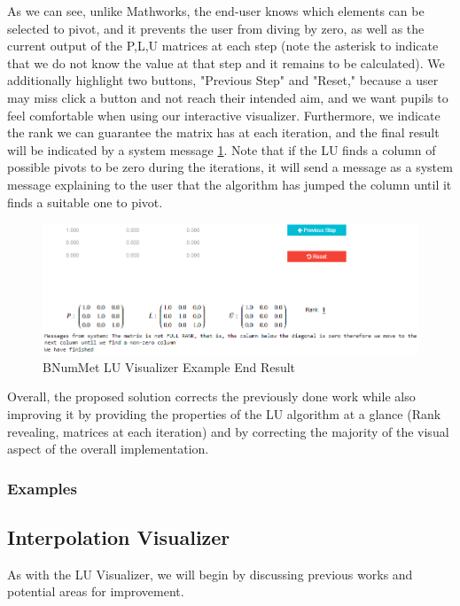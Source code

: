 As we can see, unlike Mathworks, the end-user knows which elements can be selected to pivot, and it prevents the user from diving by zero, as well as the current output of the P,L,U matrices at each step (note the asterisk to indicate that we do not know the value at that step and it remains to be calculated). We additionally highlight two buttons, "Previous Step" and "Reset," because a user may miss click a button and not reach their intended aim, and we want pupils to feel comfortable when using our interactive visualizer.
Furthermore, we indicate the rank we can guarantee the matrix has at each iteration, and the final result will be indicated by a system message \ref{fig:BNumMet Example End Result}. Note that if the LU finds a column of possible pivots to be zero during the iterations, it will send a message as a system message explaining to the user that the algorithm has jumped the column until it finds a suitable one to pivot.

\begin{figure}[H]
    \centering
    \includegraphics[width=\textwidth]{Include/Images/Thesis/Development/Visualizers/LU VISUALIZER/BNumMet.LU.Ex1.1.png}
    \caption{BNumMet LU Visualizer Example End Result}
    \label{fig:BNumMet Example End Result}
\end{figure}

Overall, the proposed solution corrects the previously done work while also improving it by providing the properties of the LU algorithm at a glance (Rank revealing, matrices at each iteration) and by correcting the majority of the visual aspect of the overall implementation.

\subsubsection{Examples}
	

\subsection{Interpolation Visualizer}
As with the LU Visualizer, we will begin by discussing previous works and potential areas for improvement.

